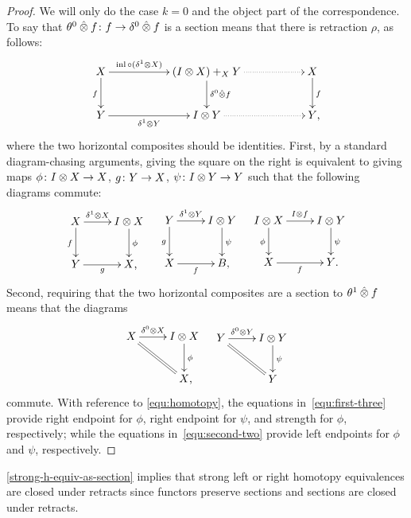 \documentclass[reqno,10pt,a4paper,oneside,draft]{amsart}
\begin{document}
\begin{proof}
We will only do the case $k = 0$ and the object part of the correspondence.
To say that $\theta^0 \mathbin{\hat{\otimes}} f \colon f \to \delta^0 \mathbin{\hat{\otimes}} f$ is a section means that there is retraction $\rho$, as follows:
\[
\xymatrix@C+3em{
  X
  \ar[r]^-{\inl \cc (\rcyl \otimes X)}
  \ar[d]_f
&
  (\interval \otimes X) +_{X} Y
  \ar[d]^{\lcyl \hatotimes f}
  \ar@{.>}[r]
&
  X
  \ar[d]^f
\\
  Y
  \ar[r]_-{\rcyl \otimes Y}
&
  \interval \otimes Y
  \ar@{.>}[r]
&
  Y
\rlap{,}}
\]
where the two horizontal composites should be identities.
First, by a standard diagram-chasing arguments, giving the square on the right is equivalent to giving maps $\phi \colon I \otimes X \to X$, $g \colon Y \to X$, $\psi \colon I \otimes Y \to Y$ such that the following diagrams commute:
\begin{align} \label{equ:first-three}
\xycenter{
  X
  \ar[r]^-{\rcyl \otimes X}
  \ar[d]_f
&
  \interval \otimes X \ar[d]^{\phi}
\\
  Y \ar[r]_{g}
&
  X
\rlap{,}}
&&
\xycenter{
  Y
  \ar[r]^-{\rcyl \otimes Y}
  \ar[d]_g
&
  \interval \otimes Y \ar[d]^{\psi}
\\
  X
  \ar[r]_f
&
  B
\rlap{,}}
&&
\xycenter{
  \interval \otimes X
  \ar[d]_\phi
  \ar[r]^{I \otimes f}
&
  \interval \otimes Y
  \ar[d]^\psi
\\
  X
  \ar[r]_{f}
&
  Y
\rlap{.}}
\end{align}
Second, requiring that the two horizontal composites are a section to $\theta^1 \mathbin{\hat{\otimes}} f$ means that the diagrams
\begin{align} \label{equ:second-two}
\xycenter{
  X
  \ar[r]^-{\lcyl \otimes X}
  \ar@{=}[dr]
&
  \interval \otimes X \ar[d]^\phi
\\&
  X
\rlap{,}}
&&
\xycenter{
  Y
  \ar[r]^-{\lcyl \otimes Y}
  \ar@{=}[dr]
&
  \interval \otimes Y \ar[d]^{\psi}
\\&
  Y
}
\end{align}
commute.
With reference to \eqref{equ:homotopy}, the equations in~\eqref{equ:first-three} provide right endpoint for $\phi$, right endpoint for $\psi$, and strength for $\phi$, respectively; while the equations in~\eqref{equ:second-two} provide left endpoints for $\phi$ and $\psi$, respectively.
\end{proof}

\begin{remark}
\cref{strong-h-equiv-as-section} implies that strong left or right homotopy equivalences are closed under retracts since functors preserve sections and sections are closed under retracts.
\end{remark}
\end{document}
